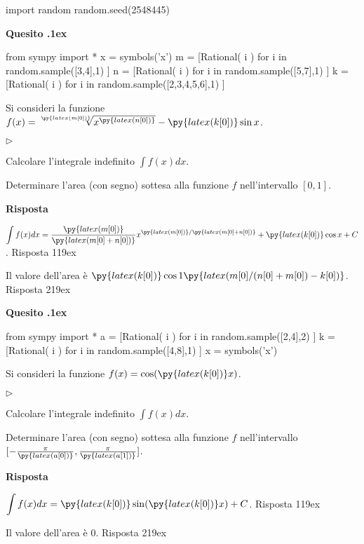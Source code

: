 \documentclass[11pt,twoside,a4paper]{article}
\newcommand{\mylabel}[1]{#1\hfill}
\renewenvironment{itemize}
  {\begin{list}{$\triangleright$}{%
   \setlength{\parskip}{0mm}
   \setlength{\topsep}{.4\baselineskip}
   \setlength{\rightmargin}{0mm}
   \setlength{\listparindent}{0mm}
   \setlength{\itemindent}{0mm}
   \setlength{\labelwidth}{2ex}
   \setlength{\itemsep}{.4\baselineskip}
   \setlength{\parsep}{0mm}
   \setlength{\partopsep}{0mm}
   \setlength{\labelsep}{1ex}
   \setlength{\leftmargin}{\labelwidth+\labelsep}
   \let\makelabel\mylabel}}{%
   \end{list}\vspace*{-1.3mm}}
\newcounter{quesito}
\newenvironment{question}{\bigskip\addtocounter{quesito}{1}\bigskip\bigskip\par\textbf{Quesito \thequesito.\kern1ex}}{\vspace{\parskip}}
\newenvironment{answer}{\par\textbf{Risposta\quad}}{\vspace{\parskip}}
\begin{document}
\begin{pycode}
import random
random.seed(2548445)
\end{pycode}
\begin{question}
\begin{pycode}
from sympy import *
x = symbols('x')
m = [Rational( i ) for i in random.sample([3,4],1) ]
n = [Rational( i ) for i in random.sample([5,7],1) ]
k = [Rational( i ) for i in random.sample([2,3,4,5,6],1) ]
\end{pycode}
Si consideri la funzione $f(x) = \sqrt[\py{latex(m[0])}]{x^{\py{latex(n[0])}}} - \py{latex(k[0])}\sin x$.
\begin{itemize}
\item[1.] Calcolare l'integrale indefinito $\displaystyle \int f(x) dx$.
\item[2.] Determinare l'area (con segno) sottesa alla funzione $f$ nell'intervallo $[0,1]$.
\end{itemize}
\begin{answer}

{\color{blue}
$\displaystyle \int f(x) dx = \frac{\py{latex(m[0])}}{\py{latex(m[0]+n[0])}}x^{\py{latex(m[0])}/\py{latex(m[0]+n[0])}} + \py{latex(k[0])}\cos x + C$.
\hfill Risposta 1\kern19ex}

\smallskip
{\color{blue} Il valore dell'area è
$\py{latex(k[0])}\cos 1 \py{latex(m[0]/(n[0]+m[0])-k[0])}$.
\hfill Risposta 2\kern19ex}

\end{answer}
\end{question}
\begin{question}
\begin{pycode}
from sympy import *
a = [Rational( i ) for i in random.sample([2,4],2) ]
k = [Rational( i ) for i in random.sample([4,8],1) ]
x = symbols('x')
\end{pycode}
Si consideri la funzione $f(x) = \cos(\py{latex(k[0])}x)$.
\begin{itemize}
\item[1.] Calcolare l'integrale indefinito $\displaystyle \int f(x) dx$.
\item[2.] Determinare l'area (con segno) sottesa alla funzione $f$ nell'intervallo $[-\frac{\pi}{\py{latex(a[0])}},\frac{\pi}{\py{latex(a[1])}}]$.
\end{itemize}
\begin{answer}

{\color{blue}
$\displaystyle \int f(x) dx = \py{latex(k[0])}\sin(\py{latex(k[0])}x) + C$.
\hfill Risposta 1\kern19ex}

\smallskip
{\color{blue} Il valore dell'area è 0.
\hfill Risposta 2\kern19ex}

\end{answer}
\end{question}
\end{document}
